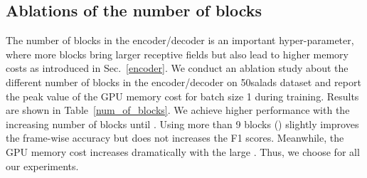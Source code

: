 \documentclass{bmvc2k}
\begin{document}
\subsection{Ablations of the number of blocks}
The number of blocks  in the encoder/decoder is an important hyper-parameter, where more blocks bring larger receptive fields but also lead to higher memory costs as introduced in Sec.~\ref{encoder}. We conduct an ablation study about the different number of blocks in the encoder/decoder on 50salads dataset and report the peak value of the GPU memory cost for batch size 1 during training. Results are shown in Table~\ref{num_of_blocks}. We achieve higher performance with the increasing number of blocks until . Using more than 9 blocks () slightly improves the frame-wise accuracy but does not increases the F1 scores. Meanwhile, the GPU memory cost increases dramatically with the large . Thus, we choose  for all our experiments.
\end{document}
